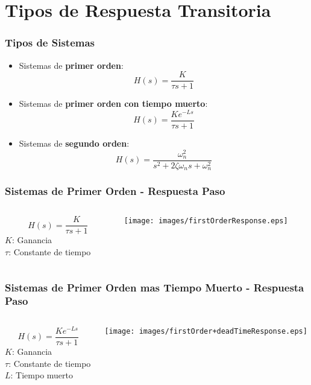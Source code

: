 \documentclass[aspectratio=169,handout]{beamer}
\theoremstyle{definition}
\theoremstyle{plain}
\theoremstyle{remark}
\begin{document}
\section{Tipos de Respuesta Transitoria}
\begin{frame}[<-+>]\frametitle{Tipos de Sistemas}
\begin{itemize}
  \item Sistemas de \textbf{primer orden}:
  \begin{equation*}
    H(s) = \frac{K}{\tau s + 1}
  \end{equation*}
  \item Sistemas de \textbf{primer orden con tiempo muerto}:
  \begin{equation*}
    H(s) = \frac{K e^{-Ls}}{\tau s + 1}
  \end{equation*}
  \item Sistemas de \textbf{segundo orden}:
  \begin{equation*}
    H(s) = \frac{\omega_n^2}{s^2 + 2 \zeta \omega_n s + \omega_n^2}
  \end{equation*}
\end{itemize}
\end{frame}

\begin{frame}[<+->][c]\frametitle{Sistemas de Primer Orden - Respuesta Paso}
\vspace*{3mm}
\begin{columns}
 \begin{column}{0.3\textwidth}
  \begin{equation*}
    H(s) = \frac{K}{\tau s + 1}
  \end{equation*}
  $K$: Ganancia\\
  $\tau$: Constante de tiempo
 \end{column} 
 \begin{column}{0.7\textwidth}
  \centering
  \texttt{[image: images/firstOrderResponse.eps]}
 \end{column} 
\end{columns}
\end{frame}

\begin{frame}\frametitle{Sistemas de Primer Orden mas Tiempo Muerto - Respuesta Paso}
\vspace*{3mm}
\begin{columns}
 \begin{column}{0.3\textwidth}
  \begin{equation*}
    H(s) = \frac{K e^{-Ls}}{\tau s + 1}
  \end{equation*}
  $K$: Ganancia\\
  $\tau$: Constante de tiempo\\
  $L$: Tiempo muerto
 \end{column} 
 \begin{column}{0.7\textwidth}
  \centering
  \texttt{[image: images/firstOrder+deadTimeResponse.eps]}
 \end{column} 
\end{columns}
\end{frame}
\end{document}
